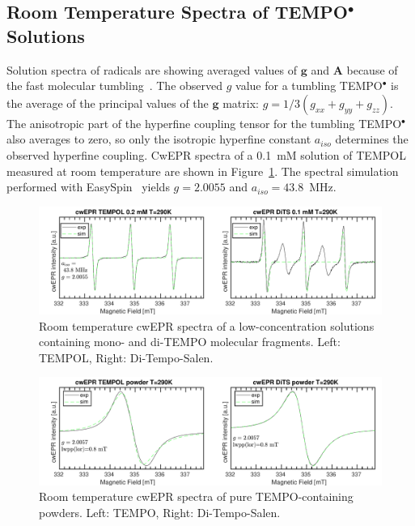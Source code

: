 \subsection{Room Temperature Spectra of TEMPO$^{\bullet}$ Solutions}
Solution spectra of radicals are showing averaged values of $\textbf{g}$ and $\textbf{A}$ because of the fast molecular tumbling~\cite{Liu_2008,Carrington_solution_epr}. The observed $g$ value for a tumbling TEMPO$^{\bullet}$ is the average of the principal values of the $\textbf{g}$ matrix: $g = 1/3\left(g_{xx}+g_{yy}+g_{zz}\right)$. The anisotropic part of the hyperfine coupling tensor for the tumbling TEMPO$^{\bullet}$ also averages to zero, so only the isotropic hyperfine constant $a_{iso}$ determines the observed hyperfine coupling. CwEPR spectra of a 0.1~mM solution of TEMPOL measured at room temperature are shown in Figure~\ref{fig:cwEPR_monoTEMPO_diTEMPO_SOLUTION}. The spectral simulation performed with EasySpin~\cite{Stoll2006} yields $g=2.0055$ and $a_{iso}=43.8$~MHz.

\begin{figure}[h]
\center
	\includegraphics[width=1\textwidth]{./operando_epr/figures/TEMPOL/cwEPR_TEMPOL_vs_DiTS_RT.pdf}
	\caption{Room temperature cwEPR spectra of a low-concentration solutions containing mono- and di-TEMPO molecular fragments. Left: TEMPOL, Right: Di-Tempo-Salen.}
	\label{fig:cwEPR_monoTEMPO_diTEMPO_SOLUTION}
\end{figure}
\begin{figure}[h]
\center
	\includegraphics[width=1\textwidth]{./operando_epr/figures/TEMPOL/cwEPR_TEMPOL_vs_DiTS_RT_POWDER.pdf}
	\caption{Room temperature cwEPR spectra of pure TEMPO-containing powders. Left: TEMPO, Right: Di-Tempo-Salen.}
	\label{fig:cwEPR_monoTEMPO_diTEMPO_POWDER}
\end{figure}

